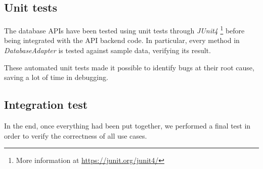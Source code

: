 \documentclass[10pt]{article}
\begin{document}
\subsection{Unit tests}
The database APIs have been tested using unit tests through \emph{JUnit4}
\footnote{More information at \url{https://junit.org/junit4/}} before being 
integrated with the API backend code. In particular, every method in 
\emph{DatabaseAdapter} is tested against sample data, verifying its result.

These automated unit tests made it possible to identify bugs at their root cause,
saving a lot of time in debugging.

\subsection{Integration test}
In the end, once everything had been put together, we performed a final test 
in order to verify the correctness of all use cases.
\end{document}
